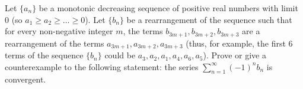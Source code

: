 Let $\{a_n\}$ be a monotonic decreasing sequence of positive real numbers with
limit 0 (so $a_1 \ge a_2 \ge \dots \ge 0$). Let $\lbrace b_n \rbrace$ be a
rearrangement of the sequence such that for every non-negative integer $m$, the
terms $b_{3m+1}, b_{3m+2}, b_{3m+3}$ are a rearrangement of the terms
$a_{3m+1}, a_{3m+2}, a_{3m+3}$ (thus, for example, the first 6 terms of the
sequence $\lbrace b_n \rbrace$ could be $a_3, a_2, a_1, a_4, a_6, a_5$). Prove
or give a counterexample to the following statement: the series
$\displaystyle{\sum_{n=1}^{\infty} (-1)^n b_n}$ is convergent.
